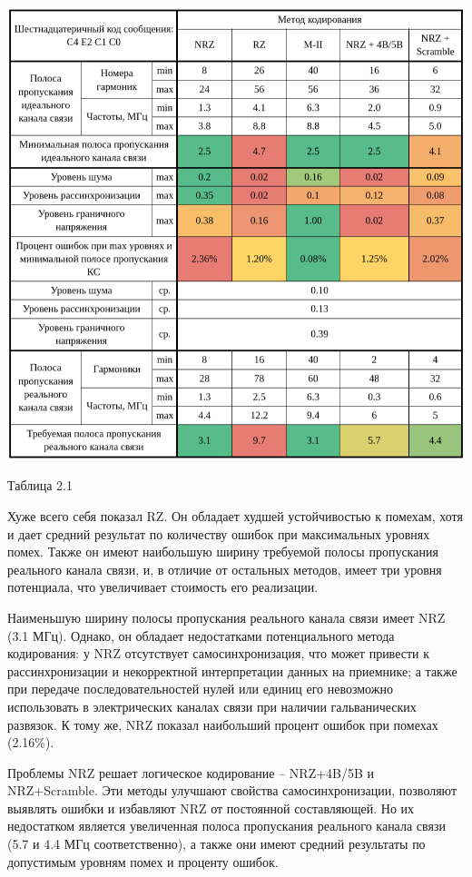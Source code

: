 \begin{table}[H]
	\captionsetup{labelformat=empty}
	\centering
	\includegraphics[width=1\textwidth]{./data/comp_table.png}
	\caption{Таблица 2.1}
\end{table}

Хуже всего себя показал RZ. Он обладает худшей устойчивостью к помехам, хотя и дает средний результат по количеству ошибок при максимальных уровнях помех. Также он имеют наибольшую ширину требуемой полосы пропускания реального канала связи, и, в отличие от остальных методов, имеет три уровня потенциала, что увеличивает стоимость его реализации.

Наименьшую ширину полосы пропускания реального канала связи имеет NRZ (3.1 МГц). Однако, он обладает недостатками потенциального метода кодирования: у NRZ отсутствует самосинхронизация, что может привести к рассинхронизации и некорректной интерпретации данных на приемнике; а также при передаче последовательностей нулей или единиц его невозможно использовать в электрических каналах связи при наличии гальванических развязок. К тому же, NRZ показал наибольший процент ошибок при помехах (2.16\%).

Проблемы NRZ решает логическое кодирование – NRZ+4B/5B и NRZ+Scramble. Эти методы улучшают свойства самосинхронизации, позволяют выявлять ошибки и избавляют NRZ от постоянной составляющей. Но их недостатком является увеличенная полоса пропускания реального канала связи (5.7 и 4.4 МГц соответственно), а также они имеют средний результаты по допустимым уровням помех и проценту ошибок.

